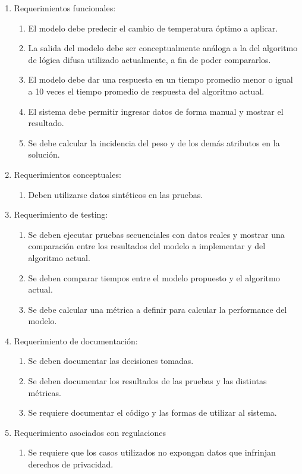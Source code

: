 \begin{enumerate}
	\item Requerimientos funcionales:
	\begin{enumerate}
		\item El modelo debe predecir el cambio de temperatura óptimo a aplicar.
		\item La salida del modelo debe ser conceptualmente análoga a la del algoritmo de lógica difusa utilizado actualmente, a fin de poder compararlos.
		\item El modelo debe dar una respuesta en un tiempo promedio menor o igual a 10 veces el tiempo promedio de respuesta del algoritmo actual.
		\item El sistema debe permitir ingresar datos de forma manual y mostrar el resultado.
		\item Se debe calcular la incidencia del peso y de los demás atributos en la solución.
	\end{enumerate}
	\item Requerimientos conceptuales:
	\begin{enumerate}
		\item Deben utilizarse datos sintéticos en las pruebas.
	\end{enumerate}
	\item Requerimiento de testing:
	\begin{enumerate}
		\item Se deben ejecutar pruebas secuenciales con datos reales y mostrar una comparación entre los resultados del modelo a implementar y del algoritmo actual.
		\item Se deben comparar tiempos entre el modelo propuesto y el algoritmo actual.
		\item Se debe calcular una métrica a definir para calcular la performance del modelo.
	\end{enumerate}
	\item Requerimiento de documentación:
	\begin{enumerate}
		\item Se deben documentar las decisiones tomadas.
		\item Se deben documentar los resultados de las pruebas y las distintas métricas.
		\item Se requiere documentar el código y las formas de utilizar al sistema.
	\end{enumerate}
	\item Requerimiento asociados con regulaciones
	\begin{enumerate}
		\item Se requiere que los casos utilizados no expongan datos que infrinjan derechos de privacidad.
	\end{enumerate}
\end{enumerate}



